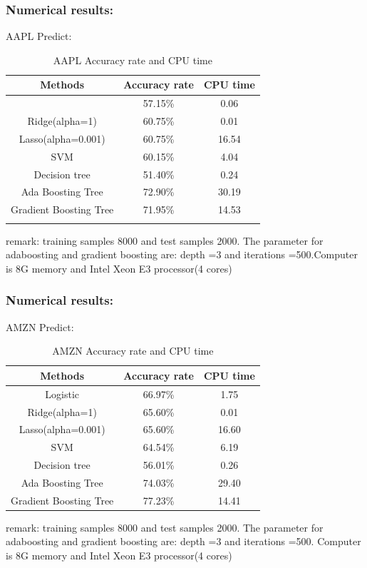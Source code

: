 \documentclass[xcolor={x11names,svgnames,dvipsnames}]{beamer}
\begin{document}
\begin{frame}
\frametitle{Numerical results:}

\begin{block}{AAPL Predict:}
\begin{table}[h!]\small
  \caption{AAPL Accuracy rate and CPU time}
\begin{center}
    \begin{tabular}{| c | c|c|}
    \hline
    Methods& Accuracy rate& CPU time \\
    \hline\small{
Logistic&57.15\%&0.06\\
Ridge(alpha=1) &60.75\%&0.01\\
Lasso(alpha=0.001)&60.75\%&16.54\\
SVM&60.15\%&4.04\\
Decision tree &51.40\%&0.24\\
Ada Boosting Tree&\alert{72.90\%}&30.19\\
Gradient Boosting Tree&\alert{71.95\%}&14.53\\}
\hline
\end{tabular}
\end{center}
\end{table}
\end{block}
\small{remark: training samples 8000 and test samples 2000. The parameter for adaboosting and gradient boosting are: depth =3 and iterations =500.Computer is 8G memory and Intel Xeon E3 processor(4 cores)}
\end{frame}


\begin{frame}
\frametitle{Numerical results:}
\small{
\begin{block}{AMZN Predict:}
\begin{table}[h!]\small
  \caption{AMZN Accuracy rate and CPU time}
\begin{center}
    \begin{tabular}{|c| c|c|}
    \hline
    Methods& Accuracy rate& CPU time \\
    \hline
Logistic&66.97\%&1.75\\
Ridge(alpha=1) &65.60\%&0.01\\
Lasso(alpha=0.001)&65.60\%&16.60\\
SVM&64.54\%&6.19\\
Decision tree &56.01\%&0.26\\
Ada Boosting Tree&\alert{74.03\%}&29.40\\
Gradient Boosting Tree&\alert{77.23\%}&14.41\\
\hline
\end{tabular}
\end{center}
\end{table}
\end{block}}
\small{remark: training samples 8000 and test samples 2000. The parameter for adaboosting and gradient boosting are: depth =3 and iterations =500. Computer is 8G memory and Intel Xeon E3 processor(4 cores)}
\end{frame}
\end{document}
